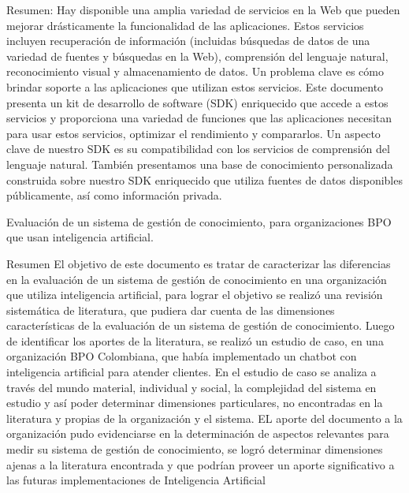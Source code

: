 Resumen:
Hay disponible una amplia variedad de servicios en la Web que pueden mejorar drásticamente la funcionalidad de las aplicaciones. Estos servicios incluyen recuperación de información (incluidas búsquedas de datos de una variedad de fuentes y búsquedas en la Web), comprensión del lenguaje natural, reconocimiento visual y almacenamiento de datos. Un problema clave es cómo brindar soporte a las aplicaciones que utilizan estos servicios. Este documento presenta un kit de desarrollo de software (SDK) enriquecido que accede a estos servicios y proporciona una variedad de funciones que las aplicaciones necesitan para usar estos servicios, optimizar el rendimiento y compararlos. Un aspecto clave de nuestro SDK es su compatibilidad con los servicios de comprensión del lenguaje natural. También presentamos una base de conocimiento personalizada construida sobre nuestro SDK enriquecido que utiliza fuentes de datos disponibles públicamente, así como información privada.
 
Evaluación de un sistema de gestión de conocimiento, para organizaciones BPO que usan inteligencia artificial.
 
Resumen El objetivo de este documento es tratar de caracterizar las diferencias en la evaluación de un sistema de gestión de conocimiento en una organización que utiliza inteligencia artificial, para lograr el objetivo se realizó una revisión sistemática de literatura, que pudiera dar cuenta de las dimensiones características de la evaluación de un sistema de gestión de conocimiento. Luego de identificar los aportes de la literatura, se realizó un estudio de caso, en una organización BPO Colombiana, que había implementado un chatbot con inteligencia artificial para atender clientes. En el estudio de caso se analiza a través del mundo material, individual y social, la complejidad del sistema en estudio y así poder determinar dimensiones particulares, no encontradas en la literatura y propias de la organización y el sistema. EL aporte del documento a la organización pudo evidenciarse en la determinación de aspectos relevantes para medir su sistema de gestión de conocimiento, se logró determinar dimensiones ajenas a la literatura encontrada y que podrían proveer un aporte significativo a las futuras implementaciones de Inteligencia Artificial

